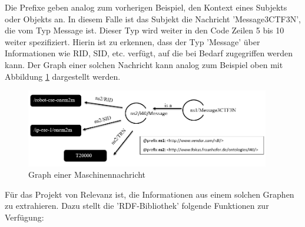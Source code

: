 \documentclass[
	12pt,								%
	DIV10,
	a4paper,         		%
	oneside,						%
	parskip=half,				%
	headings=normal,			%
	listof=totoc,					%
	bibliography=totoc,						%
	index=totoc,						%
	final								%
]{scrartcl}
\begin{document}
Die Prefixe geben analog zum vorherigen Beispiel, den Kontext eines Subjekts oder Objekts an. In diesem Falle ist das Subjekt die Nachricht 'Message3CTF3N', die vom Typ Message ist. Dieser Typ wird weiter in den Code Zeilen 5 bis 10 weiter spezifiziert. Hierin ist zu erkennen, dass der Typ 'Message' über Informationen wie RID, SID, etc. verfügt, auf die bei Bedarf zugegriffen werden kann. Der Graph einer solchen Nachricht kann analog zum Beispiel oben mit Abbildung \ref{rdfm} dargestellt werden.

\begin{figure}[H]
\centering
\includegraphics[width=0.95\textwidth]{rdfmessage}
\caption{Graph einer Maschinennachricht}
\label{rdfm}
\end{figure}

Für das Projekt von Relevanz ist, die Informationen aus einem solchen Graphen zu extrahieren. Dazu stellt die 'RDF-Bibliothek' folgende Funktionen zur Verfügung:
\end{document}

